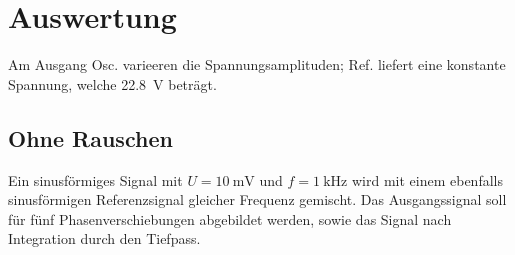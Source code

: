 \section{Auswertung}
\label{sec:Auswertung}

Am Ausgang Osc. varieeren die Spannungsamplituden; Ref. liefert eine konstante Spannung, welche \SI {22,8}{\volt} beträgt.

\subsection{Ohne Rauschen}
Ein sinusförmiges Signal mit $U = \SI{10}{\milli \volt}$ und $f = \SI{1}{\kilo \Hz}$ wird mit einem ebenfalls sinusförmigen Referenzsignal gleicher Frequenz gemischt. Das Ausgangssignal soll für fünf Phasenverschiebungen abgebildet werden, sowie das Signal nach Integration durch den Tiefpass.

